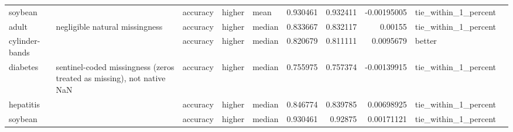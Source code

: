 \begin{table}[ht]
{\begin{tabular}{lllllrrrll}
 soybean        &                                                                       & accuracy                       & higher             & mean             &                   0.930461 &               0.932411 &                    -0.00195005  & tie\_within\_1\_percent &                                                                                                                    \\
 adult          & negligible natural missingness                                        & accuracy                       & higher             & median           &                   0.833667 &               0.832117 &                     0.00155     & tie\_within\_1\_percent &                                                                                                                    \\
 cylinder-bands &                                                                       & accuracy                       & higher             & median           &                   0.820679 &               0.811111 &                     0.0095679   & better               &                                                                                                                    \\
 diabetes       & sentinel-coded missingness (zeros treated as missing), not native NaN & accuracy                       & higher             & median           &                   0.755975 &               0.757374 &                    -0.00139915  & tie\_within\_1\_percent &                                                                                                                    \\
 hepatitis      &                                                                       & accuracy                       & higher             & median           &                   0.846774 &               0.839785 &                     0.00698925  & tie\_within\_1\_percent &                                                                                                                    \\
 soybean        &                                                                       & accuracy                       & higher             & median           &                   0.930461 &               0.92875  &                     0.00171121  & tie\_within\_1\_percent &                                                                                                                    \\

\end{tabular}}
\end{table}

